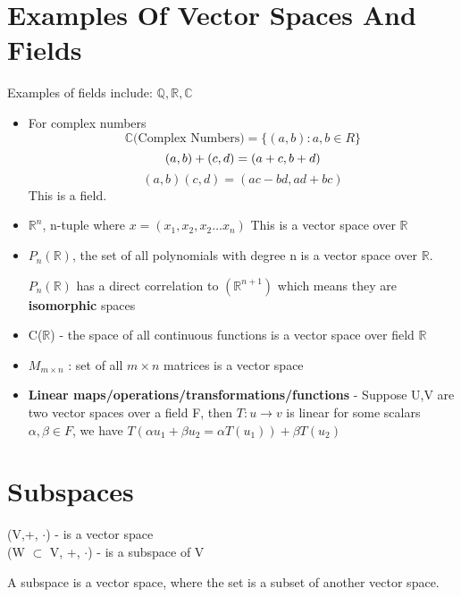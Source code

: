\documentclass{report}
\begin{document}
\section{Examples Of Vector Spaces And Fields}
Examples of fields include: $\mathbb{Q},\mathbb{R},\mathbb{C}$
\begin{itemize}
    \item For complex numbers \[\mathbb{C}\text{(Complex Numbers)} = \{(a,b): a,b \in R\}\]
        \[
            (a,b)+(c,d) = (a+c,b+d) \\
        \]
        \[
            (a,b)(c,d) = (ac-bd,ad+bc)
        \]
        This is a field.
    \item $\mathbb{R}^n$, n-tuple where $x = (x_1,x_2,x_2 \dots x_n)$
        This is a vector space over $\mathbb{R}$
    \item $P_n(\mathbb{R})$, the set of all polynomials with degree n is a vector space over $\mathbb{R}$.
    \begin{note}
        $P_n(\mathbb{R})$ has a direct correlation to $(\mathbb{R}^{n+1})$ which means they are \textbf{isomorphic} spaces
    \end{note}
    \item C($\mathbb{R}$) - the space of all continuous functions is a vector space over field $\mathbb{R}$
    \item $M_{m \times n}$ : set of all $m \times n$ matrices is a vector space
    \item \textbf{Linear maps/operations/transformations/functions} - 
        Suppose U,V are two vector spaces over a field F, then $T:u \rightarrow v$ is linear for some scalars $\alpha,\beta \in F$, we have $T(\alpha u_1 + \beta u_2 = \alpha T(u_1)) + \beta T(u_2)$
\end{itemize}

\section{Subspaces}
(V,+, $\cdot$) - is a vector space \\
(W $\subset$ V, +, $\cdot$) - is a subspace of V

A subspace is a vector space, where the set is a subset of another vector space.
\end{document}
